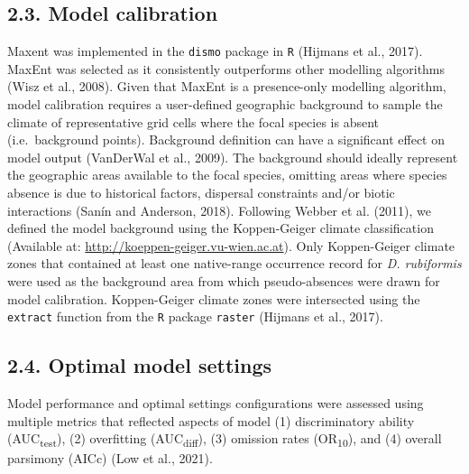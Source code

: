 \documentclass[12pt,]{article}
\begin{document}
\hypertarget{model-calibration}{%
\subsection{2.3. Model calibration}\label{model-calibration}}

Maxent was implemented in the \texttt{dismo} package in \texttt{R}
(Hijmans et al., 2017). MaxEnt was selected as it consistently
outperforms other modelling algorithms (Wisz et al., 2008). Given that
MaxEnt is a presence-only modelling algorithm, model calibration
requires a user-defined geographic background to sample the climate of
representative grid cells where the focal species is absent
(i.e.~background points). Background definition can have a significant
effect on model output (VanDerWal et al., 2009). The background should
ideally represent the geographic areas available to the focal species,
omitting areas where species absence is due to historical factors,
dispersal constraints and/or biotic interactions (Sanín and Anderson,
2018). Following Webber et al. (2011), we defined the model background
using the Koppen-Geiger climate classification (Available at:
\url{http://koeppen-geiger.vu-wien.ac.at}). Only Koppen-Geiger climate
zones that contained at least one native-range occurrence record for
\emph{D. rubiformis} were used as the background area from which
pseudo-absences were drawn for model calibration. Koppen-Geiger climate
zones were intersected using the \texttt{extract} function from the
\texttt{R} package \texttt{raster} (Hijmans et al., 2017).

\hypertarget{optimal-model-settings}{%
\subsection{2.4. Optimal model settings}\label{optimal-model-settings}}

Model performance and optimal settings configurations were assessed
using multiple metrics that reflected aspects of model (1)
discriminatory ability (AUC\textsubscript{test}), (2) overfitting
(AUC\textsubscript{diff}), (3) omission rates (OR\textsubscript{10}),
and (4) overall parsimony (AICc) (Low et al., 2021).
\end{document}
